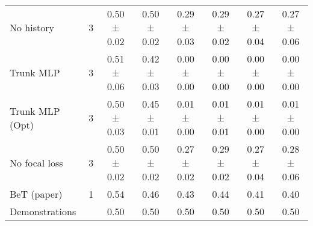 \begin{table}[htb]
{\begin{tabular}{lccccccc}
No history      & \multicolumn{1}{c|}{3}                            & 0.50 ± 0.02                             & 0.50 ± 0.02                            & 0.29 ± 0.03                               & 0.29 ± 0.02                               & 0.27 ± 0.04                                & 0.27 ± 0.06                                \\
Trunk MLP       & \multicolumn{1}{c|}{3}                            & 0.51 ± 0.06                             & 0.42 ± 0.03                            & 0.00 ± 0.00                               & 0.00 ± 0.00                               & 0.00 ± 0.00                                & 0.00 ± 0.00                                \\
Trunk MLP (Opt) & \multicolumn{1}{c|}{3}                            & 0.50 ± 0.03                             & 0.45 ± 0.01                            & 0.01 ± 0.00                               & 0.01 ± 0.01                               & 0.01 ± 0.00                                & 0.01 ± 0.00                                \\
No focal loss   & \multicolumn{1}{c|}{3}                            & 0.50 ± 0.02                             & 0.50 ± 0.02                            & 0.27 ± 0.02                               & 0.29 ± 0.02                               & 0.27 ± 0.04                                & 0.28 ± 0.06                                \\ \hline
BeT (paper)    & \multicolumn{1}{c|}{1}                            & 0.54                                    & 0.46                                   & 0.43                                      & 0.44                                      & 0.41                                       & 0.40                                       \\
Demonstrations  & \multicolumn{1}{l|}{}                             & 0.50                                    & 0.50                                   & 0.50                                      & 0.50                                      & 0.50                                       & 0.50                                                                                                           
\end{tabular}
}
\end{table}


